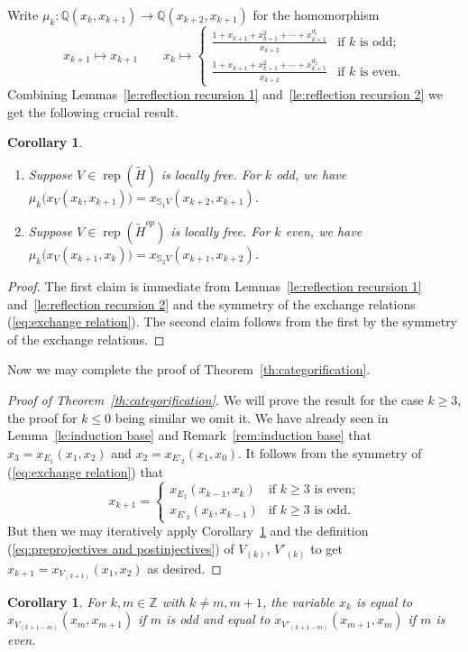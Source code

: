 \documentclass{amsart}
\numberwithin{equation}{section}
\newtheorem{corollary}[theorem]{Corollary}
\theoremstyle{definition}
\def\QQ{\mathbb{Q}}
\def\SS{\mathbb{S}}
\def\ZZ{\mathbb{Z}}
\def\rep{\operatorname{rep}}
\renewcommand{\eqref}[1]{{\rm (\ref{#1})}}
\begin{document}
Write $\mu_k:\QQ(x_k,x_{k+1})\to\QQ(x_{k+2},x_{k+1})$ for the homomorphism 
\begin{equation}\label{eq:mutation}
  x_{k+1}\mapsto x_{k+1}\qquad
  x_k\mapsto\begin{cases}
  \frac{1+x_{k+1}+x_{k+1}^2+\cdots+x_{k+1}^{d_1}}{x_{k+2}} & \text{if $k$ is odd;}\\
  \frac{1+x_{k+1}+x_{k+1}^2+\cdots+x_{k+1}^{d_2}}{x_{k+2}} & \text{if $k$ is even.}\end{cases}
\end{equation}
Combining Lemmas~\ref{le:reflection recursion 1} and~\ref{le:reflection recursion 2} we get the following crucial result.
\begin{corollary}\label{cor:cluster character dynamics}\mbox{}
  \begin{enumerate}
    \item Suppose $V\in\rep(\tilde H)$ is locally free.  For $k$ odd, we have $\mu_k\big(x_V(x_k,x_{k+1})\big)=x_{\SS_1 V}(x_{k+2},x_{k+1})$.
    \item Suppose $V\in\rep(\tilde H^{op})$ is locally free.  For $k$ even, we have $\mu_k\big(x_V(x_{k+1},x_k)\big)=x_{\SS_2 V}(x_{k+1},x_{k+2})$.
  \end{enumerate}
\end{corollary}
\begin{proof}
  The first claim is immediate from Lemmas~\ref{le:reflection recursion 1} and~\ref{le:reflection recursion 2} and the symmetry of the exchange relations \eqref{eq:exchange relation}.  The second claim follows from the first by the symmetry of the exchange relations.
\end{proof}
Now we may complete the proof of Theorem~\ref{th:categorification}.
\begin{proof}[Proof of Theorem~\ref{th:categorification}]
  We will prove the result for the case $k\ge3$, the proof for $k\le0$ being similar we omit it.  We have already seen in Lemma~\ref{le:induction base} and Remark~\ref{rem:induction base} that $x_3=x_{E_1}(x_1,x_2)$ and $x_2=x_{E'_2}(x_1,x_0)$.  It follows from the symmetry of \eqref{eq:exchange relation} that 
  \[x_{k+1}=\begin{cases}x_{E_1}(x_{k-1},x_k) & \text{if $k\ge3$ is even;}\\ x_{E'_2}(x_k,x_{k-1}) & \text{if $k\ge3$ is odd.}\end{cases}\]
  But then we may iteratively apply Corollary~\ref{cor:cluster character dynamics} and the definition \eqref{eq:preprojectives and postinjectives} of $V_{(k)}$, $V'_{(k)}$ to get $x_{k+1}=x_{V_{(k+1)}}(x_1,x_2)$ as desired.
\end{proof}
\begin{corollary}
  For $k,m\in\ZZ$ with $k\ne m,m+1$, the variable $x_k$ is equal to $x_{V_{(k+1-m)}}(x_m,x_{m+1})$ if $m$ is odd and equal to $x_{V'_{(k+1-m)}}(x_{m+1},x_m)$ if $m$ is even.
\end{corollary}
\end{document}

